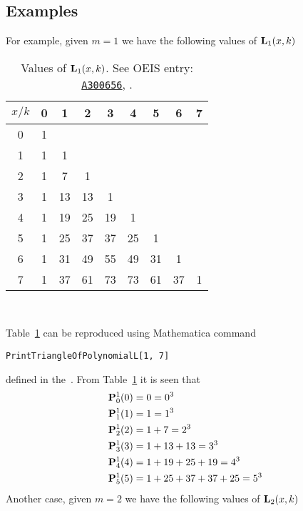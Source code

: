 \subsection{Examples} \label{subsec:examples}
For example, given $m=1$ we have the following values of ${\mathbf{L}}\sb{1}(x,k)$
\begin{table}[H]
    \setlength\extrarowheight{-6pt}
    \begin{tabular}{c|cccccccc}
        $x/k$ & 0 & 1  & 2  & 3  & 4  & 5  & 6  & 7 \\
        \hline
        0     & 1 &    &    &    &    &    &    &   \\
        1     & 1 & 1  &    &    &    &    &    &   \\
        2     & 1 & 7  & 1  &    &    &    &    &   \\
        3     & 1 & 13 & 13 & 1  &    &    &    &   \\
        4     & 1 & 19 & 25 & 19 & 1  &    &    &   \\
        5     & 1 & 25 & 37 & 37 & 25 & 1  &    &   \\
        6     & 1 & 31 & 49 & 55 & 49 & 31 & 1  &   \\
        7     & 1 & 37 & 61 & 73 & 73 & 61 & 37 & 1
    \end{tabular}~\caption{Values of ${\mathbf{L}}\sb{1}(x,k)$.
    See OEIS entry: \href{https://oeis.org/A300656}{\texttt{A300656}}, \cite{kolosov2017third}.}
    \label{tab:tab_3}
\end{table}
Table~\ref{tab:tab_3} can be reproduced using Mathematica command
\begin{center}
    \texttt{PrintTriangleOfPolynomialL[1, 7]}
\end{center}
defined in the~\cite{github_source_files}.
From Table~\ref{tab:tab_3} it is seen that
\begin{equation*}
    \begin{split}
        {\mathbf{P}}\sp{1} \sb{0}(0) &= 0 = 0^3 \\
        {\mathbf{P}}\sp{1} \sb{1}(1) &= 1 = 1^3 \\
        {\mathbf{P}}\sp{1} \sb{2}(2) &= 1+7 = 2^3 \\
        {\mathbf{P}}\sp{1} \sb{3}(3) &= 1+13+13 = 3^3 \\
        {\mathbf{P}}\sp{1} \sb{4}(4) &= 1+19+25+19 = 4^3 \\
        {\mathbf{P}}\sp{1} \sb{5}(5) &= 1+25+37+37+25 = 5^3
    \end{split}
\end{equation*}
Another case, given $m=2$ we have the following values of ${\mathbf{L}}\sb{2}(x,k)$
